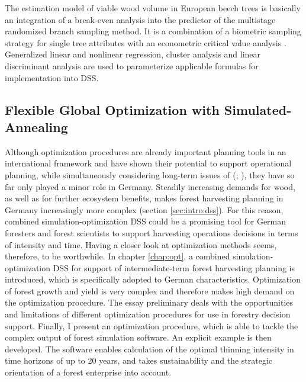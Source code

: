 The estimation model of viable wood volume in European beech trees is basically an integration of a break-even analysis into the predictor of the multistage randomized branch sampling method. It is a combination of a biometric sampling strategy for single tree attributes \citep[p. 405]{Gregoire_2008} with an econometric critical value analysis \citep[p. 46]{mushoff_2013}. Generalized linear and nonlinear regression, cluster analysis and linear discriminant analysis are used to parameterize applicable formulas for implementation into DSS.

\subsection{Flexible Global Optimization with Simulated-Annealing}
\label{subsec:intro:struct:opt}
Although optimization procedures are already important planning tools in an international framework \citep[p. 1]{hoganson_2015} and have shown their potential to support operational planning, while simultaneously considering long-term issues of (\citealp[p. 1]{hoganson_2015}; \citealp[p. 1081]{pretzsch_2008}), they have so far only played a minor role in Germany. Steadily increasing demands for wood, as well as for further ecosystem benefits, makes forest harvesting planning in Germany increasingly more complex (section \ref{sec:intro:dss}). For this reason, combined si\-mu\-la\-tion-op\-ti\-mi\-za\-tion DSS could be a promising tool for German foresters and forest scientists to support harvesting operations decisions in terms of intensity and time. Having a closer look at optimization methods seems, therefore, to be worthwhile. In chapter \ref{chap:opt}, a combined si\-mu\-la\-tion-op\-ti\-mi\-za\-tion DSS for support of intermediate-term forest harvesting planning is introduced, which is specifically adopted to German characteristics. Optimization of forest growth and yield is very complex and therefore makes high demand on the optimization procedure. The essay preliminary deals with the opportunities and limitations of different optimization procedures for use in forestry decision support. Finally, I present an optimization procedure, which is able to tackle the complex output of forest simulation software. An explicit example is then developed. The software enables calculation of the optimal thinning intensity in time horizons of up to 20 years, and takes sustainability and the strategic orientation of a forest enterprise into account.

